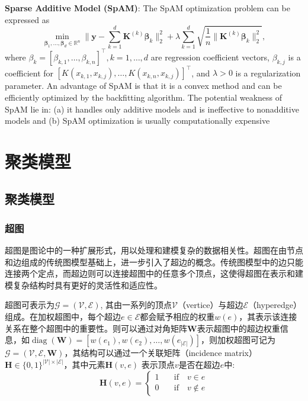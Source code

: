 \documentclass[lang=cn,10pt]{gorgeousnbook}
\numberwithin{equation}{section}%
\numberwithin{figure}{section}%
\begin{document}
\textbf{ Sparse Additive Model (SpAM)}: The SpAM optimization problem can be expressed as
\begin{equation}
\min\limits_{\boldsymbol{\beta}_1,\dots,\boldsymbol{\beta}_d\in\mathbb{R}^n}\|\boldsymbol{y}-\sum\limits_{k=1}^d\boldsymbol{K}^{(k)}\boldsymbol{\beta}_k\|_2^2+\lambda\sum\limits_{k=1}^d\sqrt{\frac{1}{n}\|\boldsymbol{K}^{(k)}\boldsymbol{\beta}_k\|_2^2},
\end{equation}
where $\beta_k = [\beta_{k,1},\ldots,\beta_{k,n}]^\top,k = 1,\ldots,d$ are regression coefficient vectors, $\beta_{k,j}$ is a coefficient for $[K(x_{k,1},x_{k,j}),\ldots,K(x_{k,n},x_{k,j})]^{\top}$, and $\lambda>0 $ is a regularization parameter. An advantage of SpAM is that it is a convex method and can be efficiently optimized by the backfitting algorithm. The potential weakness of SpAM lie in: (a)
it handles only additive models and is ineffective to nonadditive models and (b) SpAM optimization is usually
computationally expensive








\mainmatter
{}
\part{聚类模型}

\chapter{聚类模型}
\begin{center}
\end{center}
\section{超图}
超图是图论中的一种扩展形式，用以处理和建模复杂的数据相关性。超图在由节点和边组成的传统图模型基础上，进一步引入了超边的概念。传统图模型中的边只能连接两个定点，而超边则可以连接超图中的任意多个顶点，这使得超图在表示和建模复杂结构时具有更好的灵活性和适应性\cite{9264674}。

超图可表示为$\mathcal{G}=\left(\mathcal{V},\mathcal{E}\right)$, 其由一系列的顶点$\mathcal{V}$（vertice）与超边$\mathcal{E} $（hyperedge）组成。在加权超图中，每个超边$e\in\mathcal{E}$都会赋予相应的权重$w(e)$，其表示该连接关系在整个超图中的重要性。则可以通过对角矩阵$\mathbf{W}$表示超图中的超边权重信息，如$\operatorname{diag}(\mathbf{W})=[w(e_1),w(e_2),\ldots,w(e_{|\mathcal{E}|})]$，则加权超图可记为$\mathcal{G}=\left(\mathcal{V},\mathcal{E},\mathbf{W}\right)$，其结构可以通过一个关联矩阵（incidence matrix）$\mathbf{H}\in\{0,1\}^{|\mathcal{V}|\times|\mathcal{E}|}$，其中元素$\mathbf{H}(v,e)$ 表示顶点$v$是否在超边$e$中:
\begin{equation}
\mathbf{H}(v,e)=\left\{\begin{array}{cc}1&\quad\text{if}\quad v\in e\\0&\quad\text{if}\quad v\notin e\end{array}\right.
\end{equation}
\end{document}
